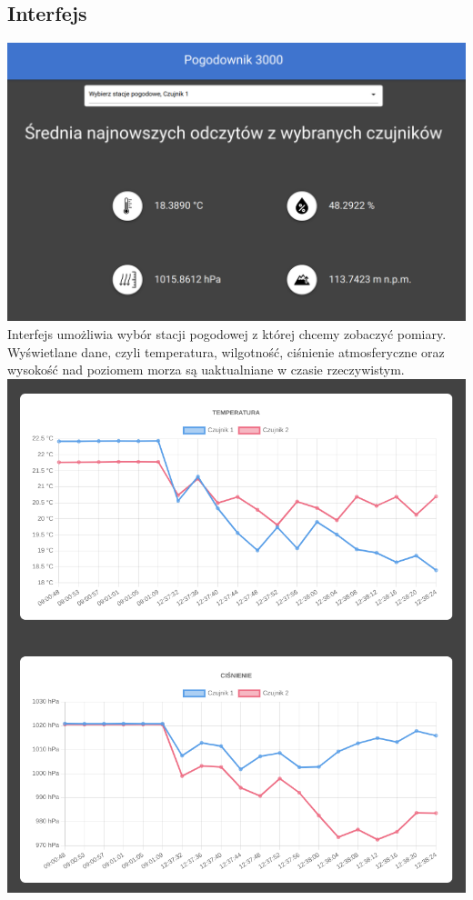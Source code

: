 \documentclass[12pt,a4paper]{article}
\begin{document}
    \subsection{Interfejs}
    \includegraphics*[scale=0.3]{int1.png}\\
    Interfejs umożliwia wybór stacji pogodowej z której chcemy zobaczyć pomiary. Wyświetlane dane, czyli temperatura, wilgotność, ciśnienie atmosferyczne oraz wysokość nad poziomem morza są uaktualniane w czasie rzeczywistym. \\
    \noindent\includegraphics*[scale=0.48]{int2.png}
    \pagebreak
\end{document}
